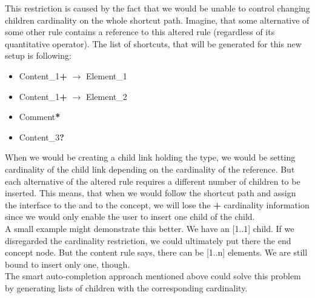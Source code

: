 This restriction is caused by the fact that we would be unable to control changing children cardinality on the whole shortcut path.
Imagine, that some alternative of some other rule contains a reference to this altered  rule (regardless of its quantitative operator).
The list of shortcuts, that will be generated for this new setup is following:

\begin{itemize}
	\itemsep0em
	\item Content{\_}1\textbf{+} $\rightarrow$ Element{\_}1
	\item Content{\_}1\textbf{+} $\rightarrow$ Element{\_}2
	\item Comment\textbf{*}
	\item Content{\_}3\textbf{?}
\end{itemize}

When we would be creating a child link holding the  type, we would be setting cardinality of the child link depending on the cardinality of the  reference.
But each alternative of the altered  rule requires a different number of children to be inserted.
This means, that when we would follow the shortcut path and assign the  interface to the  and to the  concept, we will lose the \textbf{+} cardinality information since we would only enable the user to insert one child of the  child.
\\

A small example might demonstrate this better.
We have an  [1..1] child.
If we disregarded the cardinality restriction, we could ultimately put there the  end concept node.
But the content rule says, there can be [1..n] elements.
We are still bound to insert only one, though.
\\

The smart auto-completion approach mentioned above could solve this problem by generating lists of children with the corresponding cardinality.
